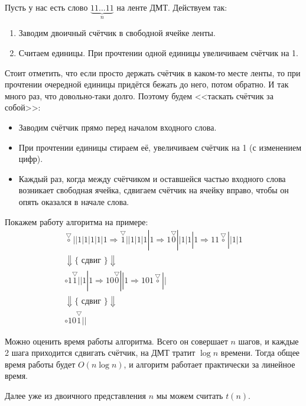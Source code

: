 \documentclass[a4paper,12pt]{article}
\begin{document}
Пусть у нас есть слово $\underbrace{11\ldots11}_{n}$ на ленте ДМТ. Действуем так:
\begin{enumerate}
    \item Заводим двоичный счётчик в свободной ячейке ленты.
    \item Считаем единицы. При прочтении одной единицы увеличиваем счётчик на 1.
\end{enumerate}
Стоит отметить, что если просто держать счётчик в каком-то месте ленты, то при прочтении очередной единицы придётся бежать до него, потом обратно. И так много раз, что довольно-таки долго. Поэтому будем <<таскать счётчик за собой>>:
\begin{itemize}
    \item Заводим счётчик прямо перед началом входного слова.
    \item При прочтении единицы стираем её, увеличиваем счётчик на 1 (с изменением цифр).
    \item Каждый раз, когда между счётчиком и оставшейся частью входного слова возникает свободная ячейка, сдвигаем счётчик на ячейку вправо, чтобы он опять оказался в начале слова.
\end{itemize}
Покажем работу алгоритма на примере:
\begin{gather*}
    \overset{\bigtriangledown}{\circ}||1|1|1|1|1 \Rightarrow \overset{\bigtriangledown}{1}||1|1|1|1\Rightarrow 1\overset{\bigtriangledown}{0}||1|1|1\Rightarrow 11\overset{\bigtriangledown}{\circ}||1|1\\ \Downarrow\{\text{ сдвиг }\}\Downarrow\\
    \circ1\overset{\bigtriangledown}{1}||1|1 \Rightarrow 10\overset{\bigtriangledown}{0}||1 \Rightarrow 101\overset{\bigtriangledown}{\circ}|| \\\Downarrow\{\text{ сдвиг }\}\Downarrow\\ 
    \circ10\overset{\bigtriangledown}{1}||
\end{gather*}

Можно оценить время работы алгоритма. Всего он совершает $n$ шагов, и каждые 2 шага приходится сдвигать счётчик, на ДМТ тратит $\log n $ времени. Тогда общее время работы будет $O(n\log n)$, и алгоритм работает практически за линейное время.

Далее уже из двоичного представления $n$ мы можем считать $t(n)$.
\end{document}
